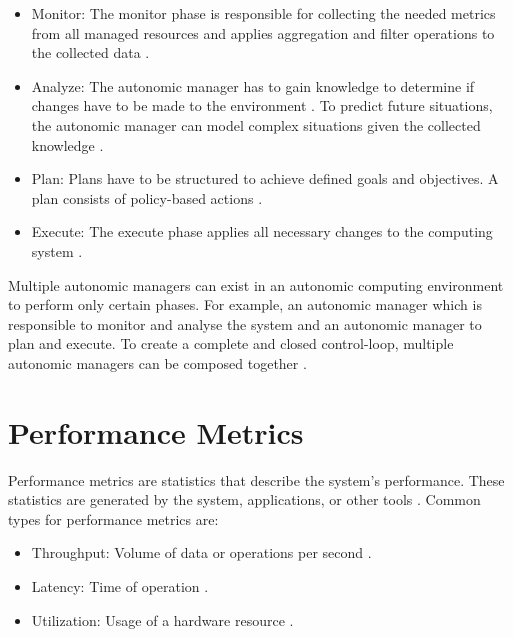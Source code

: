 \begin{itemize}
\item Monitor:
The monitor phase is responsible for collecting the needed metrics from all managed resources and applies aggregation and filter operations to the collected data \cite{Sinreich2006AnAB}.

\item Analyze:
The autonomic manager has to gain knowledge to determine if changes have to be made to the environment \cite{Sinreich2006AnAB}. To predict future situations, the autonomic manager can model complex situations given the collected knowledge \cite{Jacob2004AutonomicSolution}.

\item Plan:
Plans have to be structured to achieve defined goals and objectives. A plan consists of policy-based actions \cite{Jacob2004AutonomicSolution, Sinreich2006AnAB}.

\item Execute:
The execute phase applies all necessary changes to the computing system \cite{Sinreich2006AnAB}.
\end{itemize}

Multiple autonomic managers can exist in an autonomic computing environment to perform only certain phases. For example, an autonomic manager which is responsible to monitor and analyse the system and an autonomic manager to plan and execute. To create a complete and closed control-loop, multiple autonomic managers can be composed together \cite{Sinreich2006AnAB}.


\section{Performance Metrics}
Performance metrics are statistics that describe the system's performance. These statistics are generated by the system, applications, or other tools \cite{Greg2020SysPerf}.
Common types for performance metrics are:
\begin{itemize}
\item Throughput: Volume of data or operations per second \cite{Greg2020SysPerf}.
\item Latency: Time of operation \cite{Greg2020SysPerf}.
\item Utilization: Usage of a hardware resource \cite{Greg2020SysPerf}.
\end{itemize}


